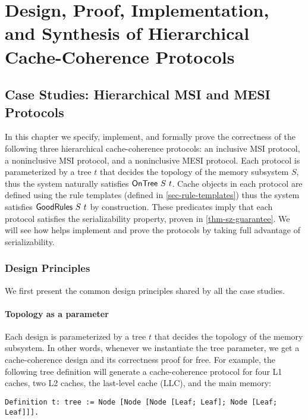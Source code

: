 \part{Design, Proof, Implementation, and Synthesis of Hierarchical Cache-Coherence Protocols}

\chapter{Case Studies: Hierarchical MSI and MESI Protocols}
\label{sec-case-study}

In this chapter we specify, implement, and formally prove the correctness of the following three hierarchical cache-coherence protocols: an inclusive MSI protocol, a noninclusive MSI protocol, and a noninclusive MESI protocol.
Each protocol is parameterized by a tree $t$ that decides the topology of the memory subsystem $S$, thus the system naturally satisfies $\mathsf{OnTree}\ S\ t$.
Cache objects in each protocol are defined using the rule templates (defined in \autoref{sec-rule-templates}) thus the system satisfies $\mathsf{GoodRules}\ S\ t$ by construction.
These predicates imply that each protocol satisfies the serializability property, proven in \autoref{thm-sz-guarantee}.
We will see how \hemiola{} helps implement and prove the protocols by taking full advantage of serializability.

\section{Design Principles}
\label{sec-design-principles}

We first present the common design principles shared by all the case studies.

\subsection{Topology as a parameter}
\label{sec-topo-param}
Each design is parameterized by a tree $t$ that decides the topology of the memory subsystem.
In other words, whenever we instantiate the tree parameter, we get a cache-coherence design and its correctness proof for free.
For example, the following tree definition will generate a cache-coherence protocol for four L1 caches, two L2 caches, the last-level cache (LLC), and the main memory:
\begin{lstlisting}[numbers=none, frame=none]
Definition t: tree := Node [Node [Node [Leaf; Leaf]; Node [Leaf; Leaf]]].
\end{lstlisting}

